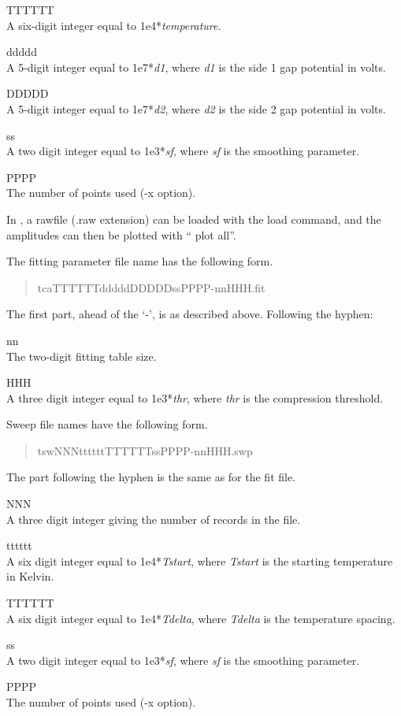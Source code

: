 {\begin{description}
\item{{\vt TTTTTT}\\
A six-digit integer equal to 1e4*{\it temperature\/}.}
\item{{\vt ddddd}\\
A 5-digit integer equal to 1e7*{\it d1\/}, where {\it d1} is the
 side 1 gap potential in volts.}
\item{{\vt DDDDD}\\
A 5-digit integer equal to 1e7*{\it d2\/}, where {\it d2} is the
 side 2 gap potential in volts.}
\item{{\vt ss}\\
A two digit integer equal to 1e3*{\it sf\/}, where {\it sf} is the
 smoothing parameter.}
\item{{\vt PPPP}\\
The number of points used ({\vt -x} option).}
\end{description}

In {\WRspice}, a rawfile ({\vt .raw} extension) can be loaded with the
{\et load} command, and the amplitudes can then be plotted with ``{\vt
plot all}''.

The fitting parameter file name has the following form.
\begin{quote}\vt
tcaTTTTTTdddddDDDDDssPPPP-nnHHH.fit
\end{quote}

The first part, ahead of the `-', is as described above.  Following
the hyphen:
\begin{description}
\item{{\vt nn}\\
The two-digit fitting table size.}
\item{{\vt HHH}\\
A three digit integer equal to 1e3*{\it thr\/}, where {\it thr} is
the compression threshold.}
\end{description}

Sweep file names have the following form.
\begin{quote}\vt
tswNNNttttttTTTTTTssPPPP-nnHHH.swp
\end{quote}

The part following the hyphen is the same as for the fit file.
\begin{description}
\item{{\vt NNN}\\
A three digit integer giving the number of records in the file.}
\item{{\vt tttttt}\\
A six digit integer equal to 1e4*{\it Tstart\/}, where
{\it Tstart} is the starting temperature in Kelvin.}
\item{{\vt TTTTTT}\\
A six digit integer equal to 1e4*{\it Tdelta\/}, where
{\it Tdelta} is the temperature spacing.}
\item{{\vt ss}\\
A two digit integer equal to 1e3*{\it sf}, where {\it sf} is the
 smoothing parameter.}
\item{{\vt PPPP}\\
The number of points used ({\vt -x} option).}
\end{description}

}
